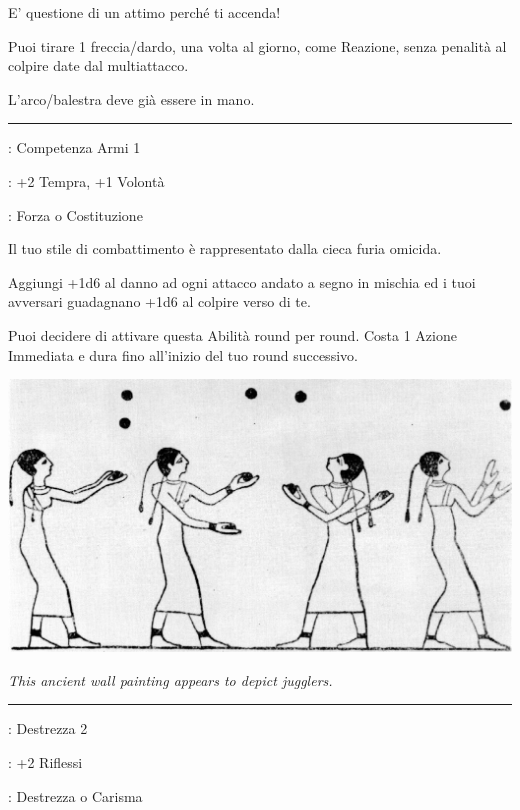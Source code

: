 \begin{multicols}{2}
E' questione di un attimo perché ti accenda!

Puoi tirare 1 freccia/dardo, una volta al giorno, come Reazione, senza penalità al colpire date dal multiattacco.

L'arco/balestra deve già essere in mano.

\smallskip\noindent\rule{\linewidth}{2pt} \hypertarget{Furia}{}\medskip{}
\noindent
\begin{description}[noitemsep, topsep=0pt, parsep=0pt, partopsep=0pt, leftmargin=0cm, labelwidth=2.5cm]
    \item[\textbf{Requisito}]: Competenza Armi 1
    \item[\textbf{Tiri Salvezza}]: +2 Tempra, +1 Volontà
    \item[\textbf{Caratteristica}]: Forza o Costituzione
\end{description}

Il tuo stile di combattimento è rappresentato dalla cieca furia omicida.

Aggiungi +1d6 al danno ad ogni attacco andato a segno in mischia ed i tuoi avversari guadagnano +1d6 al colpire verso di te.

Puoi decidere di attivare questa Abilità round per round. Costa 1 Azione Immediata e dura fino all'inizio del tuo round successivo.

\begin{center}
	\includegraphics[width=0.9\linewidth]{immagini/Early_Egyptian_juggling_art.png}

	\emph{This ancient wall painting appears to depict jugglers.}
\end{center}

\smallskip\noindent\rule{\linewidth}{2pt} \hypertarget{Giocoliere}{}\medskip{}
\noindent
\begin{description}[noitemsep, topsep=0pt, parsep=0pt, partopsep=0pt, leftmargin=0cm, labelwidth=2.5cm]
    \item[\textbf{Requisito}]: Destrezza 2
    \item[\textbf{Tiri Salvezza}]: +2 Riflessi
    \item[\textbf{Caratteristica}]: Destrezza o Carisma
\end{description}


\end{multicols}
